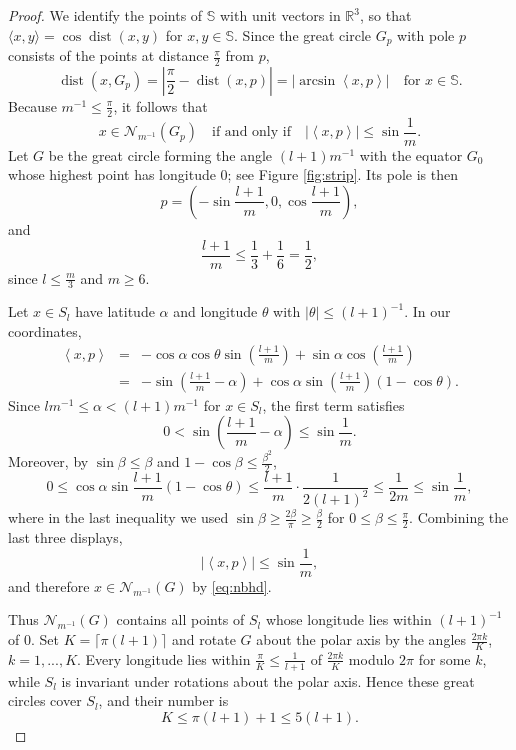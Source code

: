 \documentclass[12pt,reqno]{amsart}
\DeclareMathOperator{\dist}{dist}
\newcommand{\Nc}{\mathcal{N}}
\newcommand{\R}{\mathbb{R}}
\newcommand{\Sb}{\mathbb{S}}
\theoremstyle{plain}
\theoremstyle{definition}
\theoremstyle{remark}
\numberwithin{equation}{section}
\begin{document}
\begin{proof}
We identify the points of $\Sb$ with unit vectors in $\R^3$, so that $\langle x,y\rangle=\cos\dist(x,y)$ for $x,y\in\Sb$. Since the great circle $G_p$ with pole $p$ consists of the points at distance $\frac\pi2$ from $p$,
$$\dist\left(x,G_p\right)=\left|\frac\pi2-\dist(x,p)\right|=\left|\arcsin\left\langle x,p\right\rangle\right|\quad\text{for }x\in\Sb.$$
Because $m^{-1}\le\frac\pi2$, it follows that
\begin{equation}\label{eq:nbhd}
x\in\Nc_{m^{-1}}\left(G_p\right)\quad\text{if and only if}\quad\left|\left\langle x,p\right\rangle\right|\le\sin\frac1m.
\end{equation}
Let $G$ be the great circle forming the angle $(l+1)m^{-1}$ with the equator $G_0$ whose highest point has longitude $0$; see Figure \ref{fig:strip}. Its pole is then
$$p=\left(-\sin\frac{l+1}{m},0,\cos\frac{l+1}{m}\right),$$
and
$$\frac{l+1}{m}\le\frac13+\frac16=\frac12,$$
since $l\le\frac m3$ and $m\ge6$.

Let $x\in S_l$ have latitude $\alpha$ and longitude $\theta$ with $|\theta|\le(l+1)^{-1}$. In our coordinates,
\begin{eqnarray*}
\left\langle x,p\right\rangle&=&-\cos\alpha\cos\theta\sin\left(\frac{l+1}{m}\right)+\sin\alpha\cos\left(\frac{l+1}{m}\right)\\
&=&-\sin\left(\frac{l+1}{m}-\alpha\right)+\cos\alpha\sin\left(\frac{l+1}{m}\right)\left(1-\cos\theta\right).
\end{eqnarray*}
Since $lm^{-1}\le\alpha<(l+1)m^{-1}$ for $x\in S_l$, the first term satisfies
$$0<\sin\left(\frac{l+1}{m}-\alpha\right)\le\sin\frac1m.$$
Moreover, by $\sin\beta\le\beta$ and $1-\cos\beta\le\frac{\beta^2}{2}$,
$$0\le\cos\alpha\sin\frac{l+1}{m}\left(1-\cos\theta\right)\le\frac{l+1}{m}\cdot\frac{1}{2(l+1)^2}\le\frac{1}{2m}\le\sin\frac1m,$$
where in the last inequality we used $\sin\beta\ge\frac{2\beta}{\pi}\ge\frac\beta2$ for $0\le\beta\le\frac\pi2$. Combining the last three displays,
$$\left|\left\langle x,p\right\rangle\right|\le\sin\frac1m,$$
and therefore $x\in\Nc_{m^{-1}}(G)$ by \eqref{eq:nbhd}.

Thus $\Nc_{m^{-1}}(G)$ contains all points of $S_l$ whose longitude lies within $(l+1)^{-1}$ of $0$. Set $K=\lceil\pi(l+1)\rceil$ and rotate $G$ about the polar axis by the angles $\frac{2\pi k}{K}$, $k=1,...,K$. Every longitude lies within $\frac\pi K\le\frac{1}{l+1}$ of $\frac{2\pi k}{K}$ modulo $2\pi$ for some $k$, while $S_l$ is invariant under rotations about the polar axis. Hence these great circles cover $S_l$, and their number is
$$K\le\pi(l+1)+1\le5(l+1).$$
\end{proof}
\end{document}
